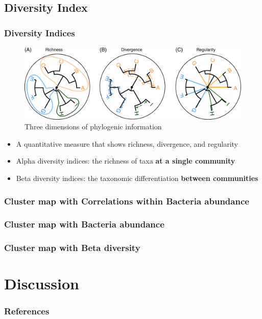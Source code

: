 \documentclass{beamer}
\begin{document}
    \subsection{Diversity Index}
    \begin{frame}
        \frametitle{Diversity Indices}

        \begin{figure}
            \includegraphics[width=0.6 \linewidth]{figures/phylogenic.jpg}
            \caption{Three dimensions of phylogenic information \protect\cite{phylogenetic1}}
        \end{figure}

        \begin{itemize}
            \item A quantitative measure that shows richness, divergence, and regularity \cite{phylogenetic1}
            \item Alpha diversity indices: the richness of taxa \textbf{at a single community}
            \item Beta diversity indices: the taxonomic differentiation \textbf{between communities}
        \end{itemize}
    \end{frame}

    \begin{frame}
        \frametitle{Cluster map with Correlations within Bacteria abundance}
    \end{frame}

    \begin{frame}
        \frametitle{Cluster map with Bacteria abundance}
    \end{frame}

    \begin{frame}
        \frametitle{Cluster map with Beta diversity}
    \end{frame}

    \section{Discussion}

   	\begin{frame}[allowframebreaks]
        \frametitle{References}
        
        
    \end{frame}
\end{document}
